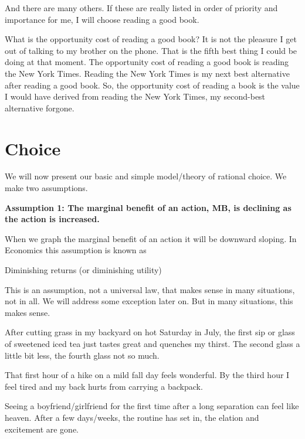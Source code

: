 \documentclass[
]{book}
\begin{document}
And there are many others. If these are really listed in order of priority and importance for me, I will choose reading a good book.

What is the opportunity cost of reading a good book? It is not the pleasure I get out of talking to my brother on the phone. That is the fifth best thing I could be doing at that moment. The opportunity cost of reading a good book is reading the New York Times. Reading the New York Times is my next best alternative after reading a good book. So, the opportunity cost of reading a book is the value I would have derived from reading the New York Times, my second-best alternative forgone.

\hypertarget{choice}{%
\section{Choice}\label{choice}}

We will now present our basic and simple model/theory of rational choice. We make two assumptions.

\begin{center}
\textbf{Assumption 1: The marginal benefit of an action, MB, is declining as the action is increased.}

\end{center}

When we graph the marginal benefit of an action it will be downward sloping. In Economics this assumption is known as

\begin{center}
Diminishing returns (or diminishing utility)

\end{center}

This is an assumption, not a universal law, that makes sense in many situations, not in all. We will address some exception later on. But in many situations, this makes sense.

After cutting grass in my backyard on hot Saturday in July, the first sip or glass of sweetened iced tea just tastes great and quenches my thirst. The second glass a little bit less, the fourth glass not so much.

That first hour of a hike on a mild fall day feels wonderful. By the third hour I feel tired and my back hurts from carrying a backpack.

Seeing a boyfriend/girlfriend for the first time after a long separation can feel like heaven. After a few days/weeks, the routine has set in, the elation and excitement are gone.
\end{document}
